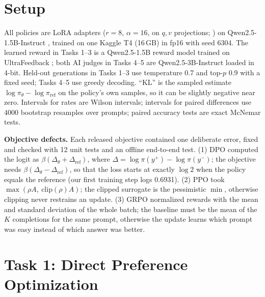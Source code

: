\documentclass{article}
\newcommand{\pref}{y^{+}}
\newcommand{\rej}{y^{-}}
\begin{document}
\section{Setup}
\label{sec:setup}
All policies are LoRA adapters ($r{=}8$, $\alpha{=}16$, on $q,v$ projections; \citealp{hu2022lora}) on Qwen2.5-1.5B-Instruct \citep{qwen2025qwen25}, trained on one Kaggle T4 (16\,GB) in fp16 with seed 6304. The learned reward in Tasks 1--3 is a Qwen2.5-1.5B reward model trained on UltraFeedback \citep{cui2024ultrafeedback}; both AI judges in Tasks 4--5 are Qwen2.5-3B-Instruct loaded in 4-bit. Held-out generations in Tasks 1--3 use temperature 0.7 and top-$p$ 0.9 with a fixed seed; Tasks 4--5 use greedy decoding. ``KL'' is the sampled estimate $\log\pi_\theta-\log\pi_{\mathrm{ref}}$ on the policy's own samples, so it can be slightly negative near zero. Intervals for rates are Wilson intervals; intervals for paired differences use 4000 bootstrap resamples over prompts; paired accuracy tests are exact McNemar tests.

\textbf{Objective defects.} Each released objective contained one deliberate error, fixed and checked with 12 unit tests and an offline end-to-end test. (1) DPO computed the logit as $\beta(\Delta_\theta + \Delta_{\mathrm{ref}})$, where $\Delta=\log\pi(\pref)-\log\pi(\rej)$; the objective needs $\beta(\Delta_\theta - \Delta_{\mathrm{ref}})$, so that the loss starts at exactly $\log 2$ when the policy equals the reference (our first training step logs 0.6931). (2) PPO took $\max(\rho A,\ \mathrm{clip}(\rho)A)$; the clipped surrogate is the pessimistic $\min$, otherwise clipping never restrains an update. (3) GRPO normalized rewards with the mean and standard deviation of the whole batch; the baseline must be the mean of the $K$ completions for the same prompt, otherwise the update learns which prompt was easy instead of which answer was better.

\section{Task 1: Direct Preference Optimization}
\label{sec:dpo}
\begin{table}[t]
\caption{DPO results. ``Full'' runs train one epoch on all retained pairs (91 steps); $^\ast$the $\beta$ forks use the shorter released budget (first 600 pairs, 37 steps), so they are compared with each other, not with the standard run. $m$: unscaled implicit-reward margin; RM: reward-model score; $\Delta$RM: paired change against SFT on the same prompts; same: generations byte-identical to SFT.}
\label{tab:dpo}
\centering\footnotesize\setlength{\tabcolsep}{2.6pt}

\end{table}
\end{document}
